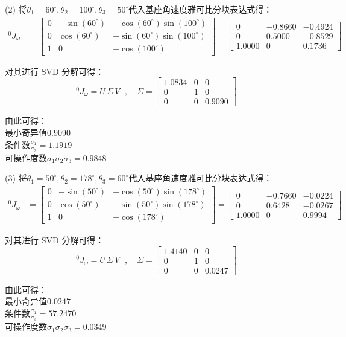 \documentclass[UTF8, 12pt]{ctexart}
\begin{document}
(2)
将\(\theta_1 = 60^\circ, \theta_2 = 100^\circ, \theta_3 = 50^\circ\)代入基座角速度雅可比分块表达式得：
\[
\begin{aligned}
{}^0 J_{\omega}
&= \begin{bmatrix}
        0 & -\sin(60^\circ) & -\cos(60^\circ)\sin(100^\circ) \\
        0 & \cos(60^\circ) & -\sin(60^\circ)\sin(100^\circ) \\
        1 & 0 & -\cos(100^\circ)
    \end{bmatrix}
 = \begin{bmatrix}
        0 & -0.8660 & -0.4924 \\
        0 & 0.5000 & -0.8529 \\
        1.0000 & 0 & 0.1736
    \end{bmatrix}
\end{aligned}
\]

对其进行 SVD 分解可得：
\[
{}^0 J_{\omega} = U\, \Sigma\, V^{\top},\quad
\Sigma = \begin{bmatrix}
            1.0834 & 0 & 0 \\
            0 & 1 & 0 \\
            0 & 0 & 0.9090
        \end{bmatrix}
\]

由此可得： \\
最小奇异值\(0.9090\) \\
条件数\(\frac{\sigma_1}{\sigma_3} = 1.1919\) \\
可操作度数\(\sigma_1 \sigma_2 \sigma_3 = 0.9848\)
\vspace{5em}


(3)
将\(\theta_1 = 50^\circ, \theta_2 = 178^\circ, \theta_3 = 60^\circ\)代入基座角速度雅可比分块表达式得：
\[
\begin{aligned}
{}^0 J_{\omega}
&= \begin{bmatrix}
        0 & -\sin(50^\circ) & -\cos(50^\circ)\sin(178^\circ) \\
        0 & \cos(50^\circ) & -\sin(50^\circ)\sin(178^\circ) \\
        1 & 0 & -\cos(178^\circ)
    \end{bmatrix}
 = \begin{bmatrix}
        0 & -0.7660 & -0.0224 \\
        0 & 0.6428 & -0.0267 \\
        1.0000 & 0 & 0.9994
    \end{bmatrix}
\end{aligned}
\]

对其进行 SVD 分解可得：
\[
{}^0 J_{\omega} = U\, \Sigma\, V^{\top},\quad
\Sigma = \begin{bmatrix}
            1.4140 & 0 & 0 \\
            0 & 1 & 0 \\
            0 & 0 & 0.0247
        \end{bmatrix}
\]

由此可得： \\
最小奇异值\(0.0247\) \\
条件数\(\frac{\sigma_1}{\sigma_3} = 57.2470\) \\
可操作度数\(\sigma_1 \sigma_2 \sigma_3 = 0.0349\)
\end{document}
